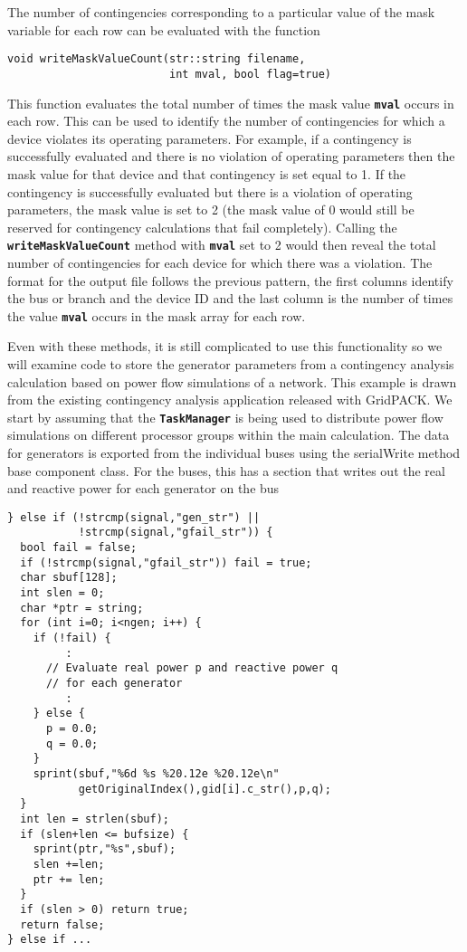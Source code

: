 The number of contingencies corresponding to a particular value of the mask variable for each row can be evaluated with the function

{
\color{red}
\begin{Verbatim}[fontseries=b]
void writeMaskValueCount(str::string filename,
                         int mval, bool flag=true)
\end{Verbatim}
}

This function evaluates the total number of times the mask value \texttt{\textbf{mval}} occurs in each row. This can be used to identify the number of contingencies for which a device violates its operating parameters. For example, if a contingency is successfully evaluated and there is no violation of operating parameters then the mask value for that device and that contingency is set equal to 1. If the contingency is successfully evaluated but there is a violation of operating parameters, the mask value is set to 2 (the mask value of 0 would still be reserved for contingency calculations that fail completely). Calling the \texttt{\textbf{writeMaskValueCount}} method with \texttt{\textbf{mval}} set to 2 would then reveal the total number of contingencies for each device for which there was a violation. The format for the output file follows the previous pattern, the first columns identify the bus or branch and the device ID and the last column is the number of times the value \texttt{\textbf{mval}} occurs in the mask array for each row.

Even with these methods, it is still complicated to use this functionality so we
will examine code to store the generator parameters from a contingency analysis
calculation based on power flow simulations of a network. This example is drawn
from the existing contingency analysis application released with GridPACK. We start by assuming that the \texttt{\textbf{TaskManager}} is being used to distribute power flow simulations on different processor groups within the main calculation. The data for generators is exported from the individual buses using the serialWrite method base component class. For the buses, this has a section that writes out the real and reactive power for each generator on the bus

{
\color{red}
\begin{Verbatim}[fontseries=b]
} else if (!strcmp(signal,"gen_str") ||
           !strcmp(signal,"gfail_str")) {
  bool fail = false;
  if (!strcmp(signal,"gfail_str")) fail = true;
  char sbuf[128];
  int slen = 0;  
  char *ptr = string;  
  for (int i=0; i<ngen; i++) {
    if (!fail) {
         :
      // Evaluate real power p and reactive power q
      // for each generator
         :
    } else {
      p = 0.0;
      q = 0.0;
    }
    sprint(sbuf,"%6d %s %20.12e %20.12e\n"
           getOriginalIndex(),gid[i].c_str(),p,q);
  }
  int len = strlen(sbuf);
  if (slen+len <= bufsize) {
    sprint(ptr,"%s",sbuf);
    slen +=len;
    ptr += len;
  }
  if (slen > 0) return true;
  return false;
} else if ...

\end{Verbatim}
}


